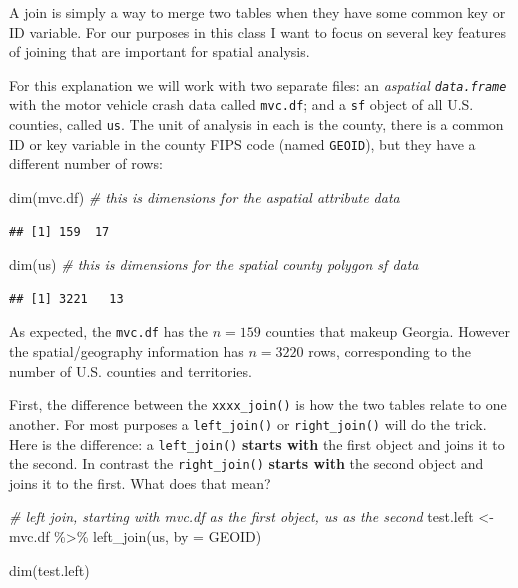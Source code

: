 \documentclass[
]{book}
\newenvironment{Shaded}{\begin{snugshade}}{\end{snugshade}}
\newcommand{\AttributeTok}[1]{\textcolor[rgb]{0.77,0.63,0.00}{#1}}
\newcommand{\CommentTok}[1]{\textcolor[rgb]{0.56,0.35,0.01}{\textit{#1}}}
\newcommand{\FunctionTok}[1]{\textcolor[rgb]{0.00,0.00,0.00}{#1}}
\newcommand{\NormalTok}[1]{#1}
\newcommand{\OtherTok}[1]{\textcolor[rgb]{0.56,0.35,0.01}{#1}}
\newcommand{\SpecialCharTok}[1]{\textcolor[rgb]{0.00,0.00,0.00}{#1}}
\newcommand{\StringTok}[1]{\textcolor[rgb]{0.31,0.60,0.02}{#1}}
\begin{document}
A join is simply a way to merge two tables when they have some common key or ID variable. For our purposes in this class I want to focus on several key features of joining that are important for spatial analysis.

For this explanation we will work with two separate files: an \emph{aspatial \texttt{data.frame}} with the motor vehicle crash data called \texttt{mvc.df}; and a \texttt{sf} object of all U.S. counties, called \texttt{us}. The unit of analysis in each is the county, there is a common ID or key variable in the county FIPS code (named \texttt{GEOID}), but they have a different number of rows:

\begin{Shaded}
\begin{Highlighting}[]
\FunctionTok{dim}\NormalTok{(mvc.df)  }\CommentTok{\# this is dimensions for the aspatial attribute data}
\end{Highlighting}
\end{Shaded}

\begin{verbatim}
## [1] 159  17
\end{verbatim}

\begin{Shaded}
\begin{Highlighting}[]
\FunctionTok{dim}\NormalTok{(us)      }\CommentTok{\# this is dimensions for the spatial county polygon sf data}
\end{Highlighting}
\end{Shaded}

\begin{verbatim}
## [1] 3221   13
\end{verbatim}

As expected, the \texttt{mvc.df} has the \(n=159\) counties that makeup Georgia. However the spatial/geography information has \(n=3220\) rows, corresponding to the number of U.S. counties and territories.

First, the difference between the \texttt{xxxx\_join()} is how the two tables relate to one another. For most purposes a \texttt{left\_join()} or \texttt{right\_join()} will do the trick. Here is the difference: a \texttt{left\_join()} \textbf{starts with} the first object and joins it to the second. In contrast the \texttt{right\_join()} \textbf{starts with} the second object and joins it to the first. What does that mean?

\begin{Shaded}
\begin{Highlighting}[]
\CommentTok{\# left join, starting with mvc.df as the first object, us as the second}
\NormalTok{test.left }\OtherTok{\textless{}{-}}\NormalTok{ mvc.df }\SpecialCharTok{\%\textgreater{}\%}
  \FunctionTok{left\_join}\NormalTok{(us, }\AttributeTok{by =} \StringTok{\textquotesingle{}GEOID\textquotesingle{}}\NormalTok{)}

\FunctionTok{dim}\NormalTok{(test.left)}
\end{Highlighting}
\end{Shaded}
\end{document}
